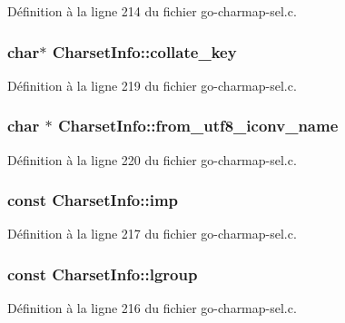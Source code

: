 Définition à la ligne 214 du fichier go-\/charmap-\/sel.c.

\subsubsection[{collate\_\-key}]{\setlength{\rightskip}{0pt plus 5cm}char$\ast$ {\bf CharsetInfo::collate\_\-key}}\label{structCharsetInfo_a3207f8911d52a4e447671f267f284e8a}


Définition à la ligne 219 du fichier go-\/charmap-\/sel.c.

\subsubsection[{from\_\-utf8\_\-iconv\_\-name}]{\setlength{\rightskip}{0pt plus 5cm}char $\ast$ {\bf CharsetInfo::from\_\-utf8\_\-iconv\_\-name}}\label{structCharsetInfo_ab2301e27c7df88620d2a1ccac08a46a7}


Définition à la ligne 220 du fichier go-\/charmap-\/sel.c.

\subsubsection[{imp}]{ const {\bf CharsetInfo::imp}}\label{structCharsetInfo_a8cb95902370f8b495f7d3896c94147f6}


Définition à la ligne 217 du fichier go-\/charmap-\/sel.c.

\subsubsection[{lgroup}]{ const {\bf CharsetInfo::lgroup}}\label{structCharsetInfo_a820f039cda853057aede7358a372066f}


Définition à la ligne 216 du fichier go-\/charmap-\/sel.c.

